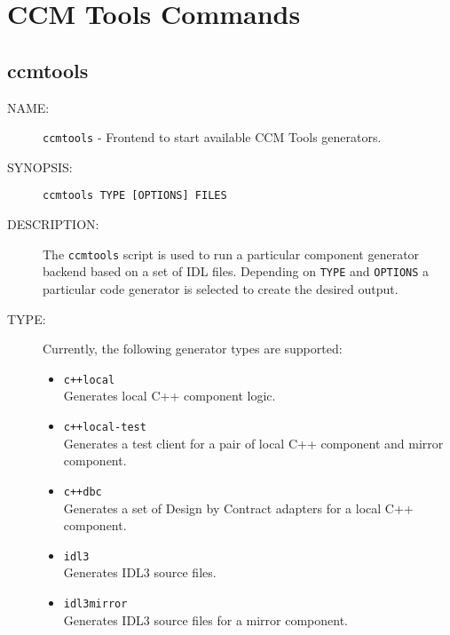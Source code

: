 
\chapter{CCM Tools Commands}

\section{ccmtools}

\begin{description}

\item [NAME:] 
  {\tt ccmtools} - Frontend to start available CCM Tools generators.

\item [SYNOPSIS:] 
  {\tt ccmtools TYPE [OPTIONS] FILES}

\item [DESCRIPTION:]
The {\tt ccmtools} script is used to run a particular component 
generator backend based on a set of IDL files. 
Depending on {\tt TYPE} and {\tt OPTIONS} a particular code generator is 
selected to create the desired output.

\item [TYPE:]
  Currently, the following generator types are supported:
  \begin{itemize}
  \item {\tt c++local}\\
    Generates local C++ component logic.
    
  \item {\tt c++local-test} \\
    Generates a test client for a pair of local C++ component and
    mirror component.
    
  \item {\tt c++dbc} \\
    Generates a set of Design by Contract adapters for a local
    C++ component.
    
  \item {\tt idl3 }\\
    Generates IDL3 source files.

  \item {\tt idl3mirror }\\
    Generates IDL3 source files for a mirror component.
    

\end{itemize}
\end{description}
